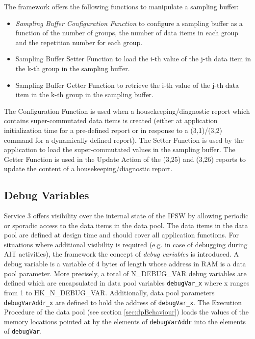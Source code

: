 \documentclass{pnp_article}
\begin{document}
The framework offers the following functions to manipulate a sampling buffer:

\begin{itemize}
\item \textit{Sampling Buffer Configuration Function} to configure a sampling buffer as a function of the number of groups, the number of data items in each group and the repetition number for each group.
\item Sampling Buffer Setter Function to load the i-th value of the j-th data item in the k-th group in the sampling buffer.
\item Sampling Buffer Getter Function to retrieve the i-th value of the j-th data item in the k-th group in the sampling buffer.
\end{itemize}

The Configuration Function is used when a housekeeping/diagnostic report which contains super-commutated data items is created (either at application initialization time for a pre-defined report or in response to a (3,1)/(3,2) command for a dynamically defined report). The Setter Function is used by the application to load the super-commutated values in the sampling buffer. The Getter Function is used in the Update Action of the (3,25) and (3,26) reports to update the content of a housekeeping/diagnostic report. 

\subsection{Debug Variables}\label{sec:debugVar}
Service 3 offers visibility over the internal state of the IFSW by allowing periodic or sporadic access to the data items in the data pool. The data items in the data pool are defined at design time and should cover all application functions. For situations where additional visibility is required (e.g. in case of debugging during AIT activities), the framework the concept of \textit{debug variables} is introduced. A debug variable is a variable of 4 bytes of length whose address in RAM is a data pool parameter. More precisely, a total of N\_DEBUG\_VAR debug variables are defined which are encapsulated in data pool variables \texttt{debugVar\_x} where x ranges from 1 to HK\_N\_DEBUG\_VAR. Additionally, data pool parameters \texttt{debugVarAddr\_x} are defined to hold the address of \texttt{debugVar\_x}. The Execution Procedure of the data pool (see section \ref{sec:dpBehaviour}) loads the values of the memory locations pointed at by the elements of \texttt{debugVarAddr} into the elements of \texttt{debugVar}.  
\end{document}
